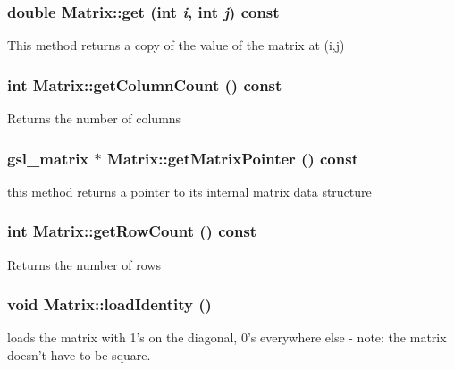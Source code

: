 \hypertarget{classCartWheel_1_1Math_1_1Matrix_aa579c908e6d968b29ed739613ca29d00}{
\subsubsection[{get}]{\setlength{\rightskip}{0pt plus 5cm}double Matrix::get (int {\em i}, \/  int {\em j}) const}}
\label{classCartWheel_1_1Math_1_1Matrix_aa579c908e6d968b29ed739613ca29d00}
This method returns a copy of the value of the matrix at (i,j) \hypertarget{classCartWheel_1_1Math_1_1Matrix_af20ba138dda21ea5c3b4fc94cfaebdca}{
\subsubsection[{getColumnCount}]{\setlength{\rightskip}{0pt plus 5cm}int Matrix::getColumnCount () const}}
\label{classCartWheel_1_1Math_1_1Matrix_af20ba138dda21ea5c3b4fc94cfaebdca}
Returns the number of columns \hypertarget{classCartWheel_1_1Math_1_1Matrix_a38ac405c65b49255f62cf6084fda191a}{
\subsubsection[{getMatrixPointer}]{\setlength{\rightskip}{0pt plus 5cm}gsl\_\-matrix $\ast$ Matrix::getMatrixPointer () const}}
\label{classCartWheel_1_1Math_1_1Matrix_a38ac405c65b49255f62cf6084fda191a}
this method returns a pointer to its internal matrix data structure \hypertarget{classCartWheel_1_1Math_1_1Matrix_a5c379dc39ded5ac48a498f6f6ad0dfc6}{
\subsubsection[{getRowCount}]{\setlength{\rightskip}{0pt plus 5cm}int Matrix::getRowCount () const}}
\label{classCartWheel_1_1Math_1_1Matrix_a5c379dc39ded5ac48a498f6f6ad0dfc6}
Returns the number of rows \hypertarget{classCartWheel_1_1Math_1_1Matrix_a980ae445a0df5fab5b4e68ce83221853}{
\subsubsection[{loadIdentity}]{\setlength{\rightskip}{0pt plus 5cm}void Matrix::loadIdentity ()}}
\label{classCartWheel_1_1Math_1_1Matrix_a980ae445a0df5fab5b4e68ce83221853}
loads the matrix with 1's on the diagonal, 0's everywhere else -\/ note: the matrix doesn't have to be square.

